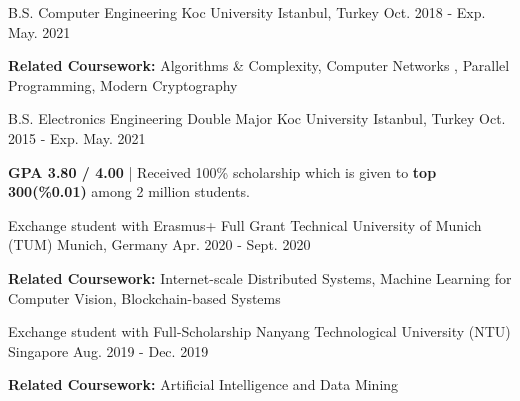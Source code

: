 \begin{cventries}

\cvopenentry
    {B.S. Computer Engineering} %
    {Koc University } %
    {Istanbul, Turkey} %
    {Oct. 2018 - Exp. May. 2021} %
    {\begin{cvitems} %
        \item {\textbf{Related Coursework:} Algorithms \& Complexity, Computer Networks
, Parallel Programming, Modern Cryptography}
      \end{cvitems}
    }
\cvopenentry
    {B.S. Electronics Engineering Double Major} %
    {Koc University } %
    {Istanbul, Turkey} %
    {Oct. 2015 - Exp. May. 2021} %
    {
      \begin{cvitems} %
        \item {\textbf{GPA 3.80 / 4.00} | Received 100\% scholarship which is given to \textbf{top 300(\%0.01)} among 2 million students.}
      \end{cvitems}
    }
\cvopenentry
    {Exchange student with Erasmus+ Full Grant }
    {Technical University of Munich (TUM)} %
    {Munich, Germany} %
    {Apr. 2020 - Sept. 2020} %
    {\begin{cvitems} %
        \item {\textbf{Related Coursework:} Internet-scale Distributed Systems, Machine Learning for Computer Vision, Blockchain-based Systems}
      \end{cvitems}
    }
\cvopenentry
    {Exchange student with Full-Scholarship}
    {Nanyang Technological University (NTU)} %
    {Singapore} %
    {Aug. 2019 - Dec. 2019} %
    {\begin{cvitems} %
        \item {\textbf{Related Coursework:} Artificial Intelligence and Data Mining}
      \end{cvitems}
    }
   
\end{cventries}
